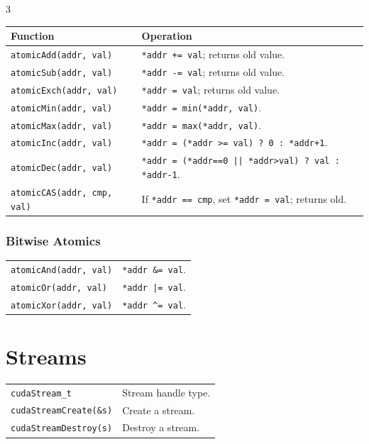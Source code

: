 \begin{multicols*}{3}
\begin{tabularx}{\linewidth}{lX}
\hline
\textbf{Function} & \textbf{Operation} \\
\hline
\texttt{atomicAdd(addr, val)}  & \texttt{*addr += val}; returns old value. \\
\texttt{atomicSub(addr, val)}  & \texttt{*addr -= val}; returns old value. \\
\texttt{atomicExch(addr, val)} & \texttt{*addr = val}; returns old value. \\
\texttt{atomicMin(addr, val)}  & \texttt{*addr = min(*addr, val)}. \\
\texttt{atomicMax(addr, val)}  & \texttt{*addr = max(*addr, val)}. \\
\texttt{atomicInc(addr, val)}  & \texttt{*addr = (*addr >= val) ? 0 : *addr+1}. \\
\texttt{atomicDec(addr, val)}  & \texttt{*addr = (*addr==0 || *addr>val) ? val : *addr-1}. \\
\texttt{atomicCAS(addr, cmp, val)} & If \texttt{*addr == cmp}, set \texttt{*addr = val}; returns old. \\
\hline
\end{tabularx}

\subsubsection*{Bitwise Atomics}

\begin{tabularx}{\linewidth}{lX}
\texttt{atomicAnd(addr, val)} & \texttt{*addr \&= val}. \\
\texttt{atomicOr(addr, val)}  & \texttt{*addr |= val}. \\
\texttt{atomicXor(addr, val)} & \texttt{*addr \^{}= val}. \\
\end{tabularx}


\section*{Streams}

\begin{tabularx}{\linewidth}{lX}
\hline
\texttt{cudaStream\_t}         & Stream handle type. \\
\texttt{cudaStreamCreate(\&s)} & Create a stream. \\
\texttt{cudaStreamDestroy(s)}  & Destroy a stream. \\
\hline
\end{tabularx}


\end{multicols*}
